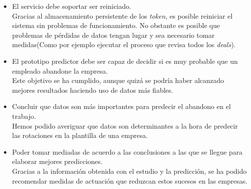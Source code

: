 \begin{itemize}
	\item El servicio debe soportar ser reiniciado.\\
	
	Gracias al almacenamiento persistente de los \textit{token}, es posible reiniciar el sistema sin problemas de funcionamiento. No obstante es posible que problemas de pérdidas de datos tengan lugar y sea necesario tomar medidas(Como por ejemplo ejecutar el proceso que revisa todos los \textit{deals}).
	\item El prototipo predictor debe ser capaz de decidir si es muy probable que un empleado abandone la empresa.\\
	
	Este objetivo se ha cumplido, aunque quizá se podría haber alcanzado mejores resultados haciendo uso de datos más fiables.
	\item Concluir que datos son más importantes para predecir el abandono en el trabajo.\\
	
	Hemos podido averiguar que datos son determinantes a la hora de predecir las rotaciones en la plantilla de una empresa.
	\item Poder tomar mediadas de acuerdo a las conclusiones a las que se llegue para elaborar mejores predicciones.\\
	
	Gracias a la información obtenida con el estudio y la predicción, se ha podido recomendar medidas de actuación que reduzcan estos sucesos en las empresas.
\end{itemize}




